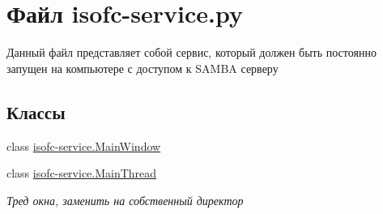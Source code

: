 \hypertarget{isofc-service_8py}{}\section{Файл isofc-\/service.py}
\label{isofc-service_8py}


Данный файл представляет собой сервис, который должен быть постоянно запущен на компьютере с доступом к S\+A\+M\+BA серверу  


\subsection*{Классы}
\begin{DoxyCompactItemize}
\item 
class \mbox{\hyperlink{classisofc-service_1_1MainWindow}{isofc-\/service.\+Main\+Window}}
\item 
class \mbox{\hyperlink{classisofc-service_1_1MainThread}{isofc-\/service.\+Main\+Thread}}
\begin{DoxyCompactList}\small\item\em Тред окна, заменить на собственный директор \end{DoxyCompactList}\end{DoxyCompactItemize}
